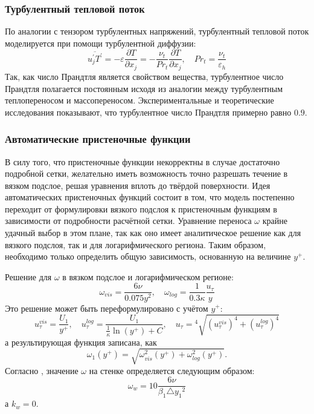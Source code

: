 			\subsubsection{Турбулентный тепловой поток}
			По аналогии с тензором турбулентных напряжений, турбулентный тепловой поток моделируется при помощи турбулентной диффузии:
				\begin{equation}
					\overline{u^{'}_jT^{'}} = - \varepsilon \frac{\partial T}{\partial x_j} = -\frac{\nu_t}{Pr_t}\frac{\partial T}{\partial x_j}, \quad Pr_t = \frac{\nu_t}{\varepsilon_h}
				\end{equation}
				Так, как число Прандтля является свойством вещества, турбулентное число Прандтля полагается постоянным исходя из аналогии между турбулентным теплопереносом и массопереносом. Экспериментальные и теоретические исследования показывают, что турбулентное число Прандтля примерно равно $0.9$.
			\subsubsection{Автоматические пристеночные функции}
				В силу того, что пристеночные функции некорректны в случае достаточно подробной сетки, желательно иметь возможность точно разрешать течение в вязком подслое, решая уравнения вплоть до твёрдой поверхности. Идея автоматических пристеночных функций состоит в том, что модель постепенно переходит от формулировки вязкого подслоя к пристеночным функциям в зависимости от подробности расчётной сетки. Уравнение переноса $\omega$ крайне удачный выбор в этом плане, так как оно имеет аналитическое решение как для вязкого подслоя, так и для логарифмического региона. Таким образом, необходимо только определить общую зависимость, основанную на величине $y^{+}$.
				
				Решение для $\omega$ в вязком подслое и логарифмическом регионе:
				\begin{equation}
					\omega_{vis} = \frac{6\nu}{0.075 y^2}, \quad \omega_{log} = \frac{1}{0.3 \kappa}\frac{u_{\tau}}{y}
				\end{equation}
				Это решение может быть переформулировано с учётом $y^{+}$:
				\begin{equation}
						u_{\tau}^{vis} = \frac{U_1}{y^{+}}, \quad u_{\tau}^{log} = \frac{U_1}{\frac{1}{\kappa}\ln(y^{+})+C}, \quad u_{\tau} = {}^4\sqrt{(u_{\tau}^{vis})^4 + (u_{\tau}^{log})^4}
				\end{equation}
				а результирующая функция записана, как
				\begin{equation}
					\omega_1(y^{+})=\sqrt{\omega^2_{vis}(y^{+})+\omega^2_{log}(y^{+})}.
				\end{equation}
				Согласно \cite{Garbarek}, значение $\omega$ на стенке определяется следующим образом:
		\begin{equation}
			\omega_w = 10 \frac{6\nu}{\beta_1 \triangle{y_1}^2}
		\end{equation}
		а $k_w = 0$.
	
